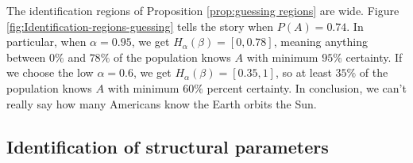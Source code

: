 The identification regions of Proposition \ref{prop:guessing regions} are wide. Figure \ref{fig:Identification-regions-guessing} tells the story when $P(A)=0.74$. In particular, when $\alpha=0.95$, we get $H_\alpha(\beta)=[0,0.78]$, meaning anything between $0\%$ and $78\%$ of the population knows $A$ with minimum $95\%$ certainty. If we choose the low $\alpha=0.6$, we get $H_\alpha(\beta)=[0.35,1]$, so at least $35\%$ of the population knows $A$ with minimum $60\%$ percent certainty. In conclusion, we can't really say how many Americans know the Earth orbits the Sun.

\subsection{Identification of structural parameters}

